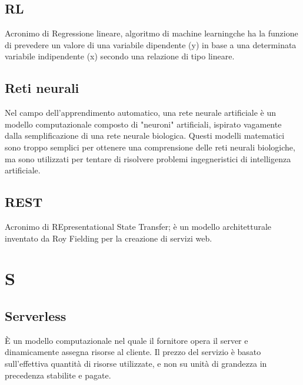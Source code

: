 
\subsection*{RL}
Acronimo di Regressione lineare, algoritmo di machine learning\glosp che ha la funzione di prevedere un valore di una variabile dipendente (y) in base a una determinata variabile indipendente (x) secondo una relazione di tipo lineare.

\subsection*{Reti neurali}
Nel campo dell'apprendimento automatico, una rete neurale artificiale  è un modello computazionale composto di "neuroni" artificiali, ispirato vagamente dalla semplificazione di una rete neurale biologica. Questi modelli matematici sono troppo semplici per ottenere una comprensione delle reti neurali biologiche, ma sono utilizzati per tentare di risolvere problemi ingegneristici di intelligenza artificiale.

\subsection*{REST}
Acronimo di REpresentational State Transfer; è un modello architetturale inventato da Roy Fielding per la creazione di servizi web.

\clearpage
\section*{S}


\subsection*{Serverless}
È un modello computazionale nel quale il fornitore opera il server e dinamicamente assegna risorse al cliente. Il prezzo del servizio è basato sull'effettiva quantità di risorse utilizzate, e non su unità di grandezza in precedenza stabilite e pagate.

